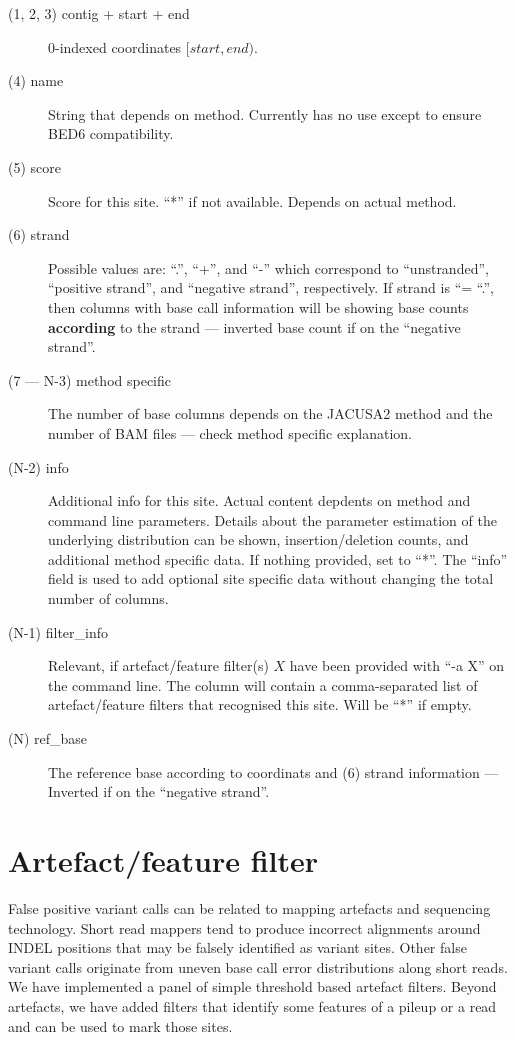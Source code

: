 \documentclass[10pt,a4paper]{article} \usepackage[utf8]{inputenc}
\begin{document}
\begin{description}
  \item[(1, 2, 3) contig + start + end] 0-indexed coordinates $[start, end)$.
  \item[(4) name] String that depends on method. Currently has no use except to ensure BED6 compatibility.
  \item[(5) score] Score for this site. ``*'' if not available. Depends on actual method.
  \item[(6) strand] Possible values are: ``.'', ``+'', and ``-'' which correspond to ``unstranded'',
  ``positive strand'', and ``negative strand'', respectively. If strand is ``= ``.'', then columns
  with base call information will be showing base counts \textbf{according} to the strand --- inverted
  base count if on the ``negative strand''.
  \item[(7 --- N-3) method specific] The number of base columns depends on the JACUSA2 method and
  the number of BAM files --- check method specific explanation.
  \item[(N-2) info] Additional info for this site. Actual content depdents on method and command
  line parameters. Details about the parameter estimation of the underlying distribution can be shown,
  insertion/deletion counts, and additional method specific data. If nothing  provided, set to ``*''. 
  The ``info'' field is used to add optional site specific data without changing 
  the total number of columns.
  \item[(N-1) filter\_info] Relevant, if artefact/feature filter(s) $X$ have been provided with 
  ``-a X'' on the command line. The column will contain a comma-separated list of artefact/feature 
  filters that recognised this site. Will be ``*'' if empty.\\
  \item[(N) ref\_base] The reference base according to coordinats and (6) strand information --- 
  Inverted if on the ``negative strand''.
\end{description}
\section{Artefact/feature filter}
False positive variant calls can be related to mapping artefacts and sequencing technology.
Short read mappers tend to produce incorrect alignments around INDEL positions that may be falsely identified as variant sites.
Other false variant calls originate from uneven base call error distributions along short reads.
We have implemented a panel of simple threshold based artefact filters. Beyond artefacts, we have added filters
that identify some features of a pileup or a read and can be used to mark those sites.
\end{document}
